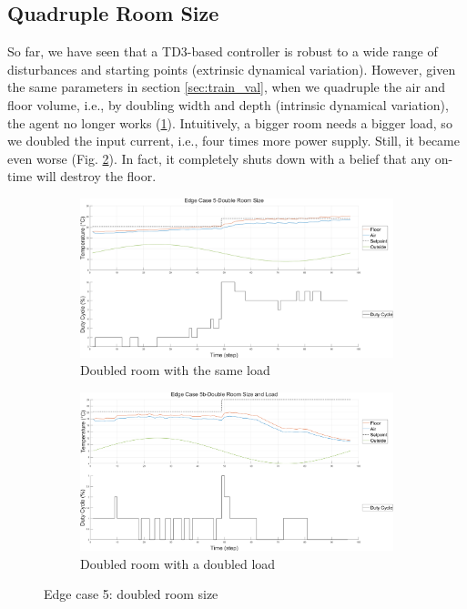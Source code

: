 \documentclass[../main.tex]{subfiles}
\begin{document}
\subsection{Quadruple Room Size}
So far, we have seen that a TD3-based controller is robust to a wide range of disturbances and starting points (extrinsic dynamical variation). However, given the same parameters in section \ref{sec:train_val}, when we quadruple the air and floor volume, i.e., by doubling width and depth (intrinsic dynamical variation), the agent no longer works (\ref{fig:edge_5a}). Intuitively, a bigger room needs a bigger load, so we doubled the input current, i.e., four times more power supply. Still, it became even worse (Fig. \ref{fig:edge_5b}). In fact, it completely shuts down with a belief that any on-time will destroy the floor.
\begin{figure}
    \centering
    \begin{subfigure}{\textwidth}
        \includegraphics[width=1\linewidth]{figures/EdgeCase5-DoubleRoomSize.png}
        \caption{Doubled room with the same load}
        \label{fig:edge_5a}
    \end{subfigure}
    \begin{subfigure}{\textwidth}
    \includegraphics[width=1\linewidth]{figures/EdgeCase5b-DoubleRoomSizeandLoad.png}
    \caption{Doubled room with a doubled load}
    \label{fig:edge_5b}
    \end{subfigure}
\caption{Edge case 5: doubled room size}
\label{fig:edge_5}
\end{figure}
\end{document}
